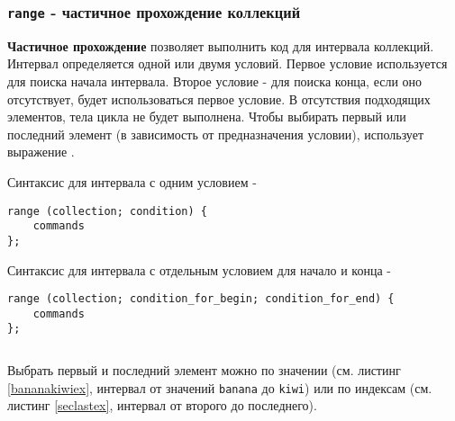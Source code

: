 \begin{sourcecode}
	\label{filterdataex}
    \inputminted[linenos]{icl}{../sources/filterdataex.icL}
\end{sourcecode}

\subsubsection{\texttt{range} - частичное прохождение коллекций}

{\bf Частичное прохождение} позволяет выполнить код для интервала коллекций. Интервал определяется одной или двумя условий. Первое условие используется для поиска начала интервала. Второе условие - для поиска конца, если оно отсутствует, будет использоваться первое условие. В отсутствия подходящих элементов, тела цикла не будет выполнена. Чтобы выбирать первый или последний элемент (в зависимость от предназначения условии), использует выражение \true{}.

Синтаксис для интервала с одним условием -
\begin{verbatim}
range (collection; condition) {
	commands
};
\end{verbatim}

Синтаксис для интервала с отдельным условием для начало и конца -
\begin{verbatim}
range (collection; condition_for_begin; condition_for_end) {
	commands
};
\end{verbatim}

\begin{sourcecode}
	\label{filterindexex}
    \inputminted[linenos]{icl}{../sources/filterindexex.icL}
\end{sourcecode}

Выбрать первый и последний элемент можно по значении (см. листинг \ref{bananakiwiex}, интервал от значений \texttt{banana} до \texttt{kiwi}) или по индексам (см. листинг \ref{seclastex}, интервал от второго до последнего).

\begin{sourcecode}
	\label{bananakiwiex}
    \inputminted[linenos]{icl}{../sources/bananakiwiex.icL}
\end{sourcecode}

\begin{sourcecode}
	\label{seclastex}
    \inputminted[linenos]{icl}{../sources/seclastex.icL}
\end{sourcecode}

